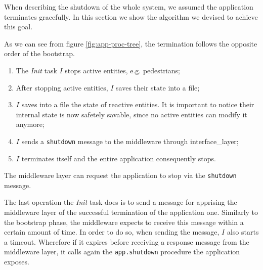 When describing the shutdown of the whole system, we assumed the application
terminates gracefully.
In this section we show the algorithm we devised to achieve this goal.

As we can see from figure \ref{fig:app-proc-tree}, the termination follows the
opposite order of the bootstrap.

\begin{enumerate}
  \item The \textit{Init} task $I$ stops active entities, e.g. pedestrians;
  \item After stopping active entities, $I$ saves their state into a file;
  \item $I$ saves into a file the state of reactive entities.
  It is important to notice their internal state is now safetely savable,
  since no active entities can modify it anymore;
  \item $I$ sends a \texttt{shutdown} message to the middleware through
  interface\_layer;
  \item $I$ terminates itself and the entire application consequently stops.
\end{enumerate}

The middleware layer can request the application to stop via the
\texttt{shutdown} message.

The last operation the \textit{Init} task does is to send a message for apprising
the middleware layer of the successful termination of the application one.
Similarly to the bootstrap phase, the middleware expects to receive this
message within a certain amount of time.
In order to do so, when sending the message, $I$ also starts a timeout.
Wherefore if it expires before receiving a response message from the middleware layer,
it calls again the \texttt{app.shutdown} procedure the application exposes.
